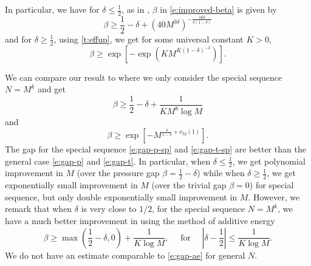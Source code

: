 \documentclass[reqno,12pt,letterpaper]{amsart}
\numberwithin{equation}{section}
\numberwithin{prop}{section}
\begin{document}
In particular, we have for $\delta\leq\frac{1}{2}$, as in \cite[\S 5.3]{regfup}, $\beta$ in \eqref{e:improved-beta} is given by
\begin{equation}
\label{e:gap-p}
\beta\geq \frac{1}{2}-\delta+(40M^{3\delta})^{-\frac{160}{\delta(1-\delta)}}
\end{equation}
and for $\delta\geq\frac{1}{2}$, using \eqref{t:effup}, we get for some universal constant $K>0$,
\begin{equation}
\label{e:gap-t}
\beta\geq\exp\left[-\exp\left(KM^{K(1-\delta)^{-2}}\right)\right].
\end{equation}

We can compare our result to \cite{oqm} where we only consider the special sequence $N=M^k$ and get
\begin{equation}
\label{e:gap-p-sp}
\beta\geq \frac{1}{2}-\delta+\frac{1}{KM^8\log M}
\end{equation}
and
\begin{equation}
\label{e:gap-t-sp}
\beta\geq \exp\left[-M^{\frac{\delta}{1-\delta}+o_M(1)}\right].
\end{equation}
The gap for the special sequence \eqref{e:gap-p-sp} and \eqref{e:gap-t-sp} are better than the general case \eqref{e:gap-p} and \eqref{e:gap-t}. In particular, when $\delta\leq\frac{1}{2}$, we get polynomial improvement in $M$ (over the pressure gap $\beta=\frac{1}{2}-\delta$) while when $\delta\geq\frac{1}{2}$, we get exponentially small improvement in $M$ (over the trivial gap $\beta=0$) for special sequence, but only double exponentially small improvement in $M$. However, we remark that when $\delta$ is very close to $1/2$, for the special sequence $N=M^k$, we have a much better improvement in \cite{oqm} using the method of additive energy
\begin{equation}
\label{e:gap-ae}
\beta\geq\max\left(\frac{1}{2}-\delta,0\right)+\frac{1}{K\log M},\quad \text{ for } \quad \left|\delta-\frac{1}{2}\right|\leq\frac{1}{K\log M}.
\end{equation}
We do not have an estimate comparable to \eqref{e:gap-ae} for general $N$.

\def\arXiv#1{\href{http://arxiv.org/abs/#1}{arXiv:#1}}
\end{document}
